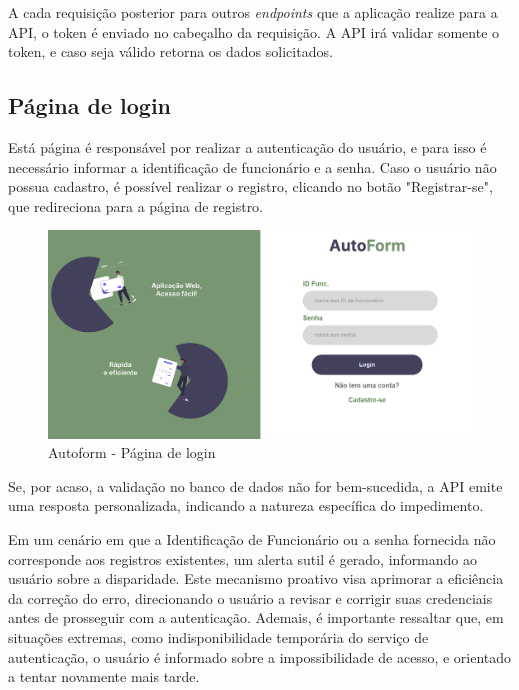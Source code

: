 A cada requisição posterior para outros \textit{endpoints} que a aplicação realize para a API, o token é enviado no cabeçalho da requisição. A API irá validar somente o token, e caso seja válido retorna os dados solicitados.

\subsection{Página de login}
Está página é responsável por realizar a autenticação do usuário, e para isso é necessário informar a identificação de funcionário e a senha. Caso o usuário não possua cadastro, é possível realizar o registro, clicando no botão "Registrar-se", que redireciona para a página de registro.

\begin{figure}[htb]
    \caption{\label{fig:tela-login}Autoform - Página de login}
    \begin{center}
        \includegraphics[scale=0.5]{imagens/login-autoform.png}
    \end{center}
\end{figure}

 Se, por acaso, a validação no banco de dados não for bem-sucedida, a API emite uma resposta personalizada, indicando a natureza específica do impedimento.

Em um cenário em que a Identificação de Funcionário ou a senha fornecida não corresponde aos registros existentes, um alerta sutil é gerado, informando ao usuário sobre a disparidade. Este mecanismo proativo visa aprimorar a eficiência da correção do erro, direcionando o usuário a revisar e corrigir suas credenciais antes de prosseguir com a autenticação.
Ademais, é importante ressaltar que, em situações extremas, como indisponibilidade temporária do serviço de autenticação, o usuário é informado sobre a impossibilidade de acesso, e orientado a tentar novamente mais tarde.

